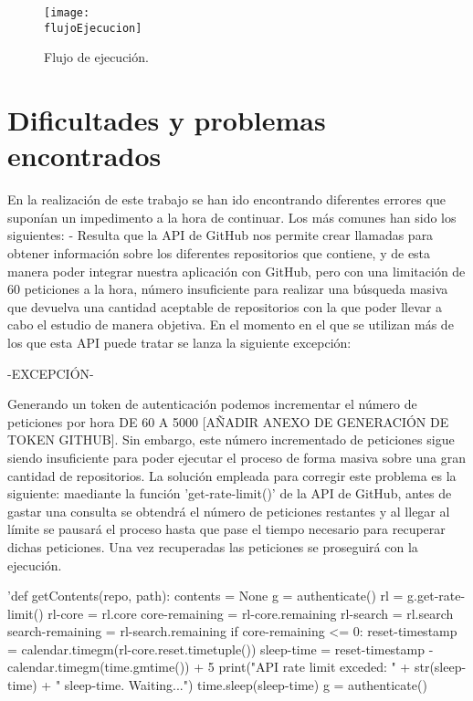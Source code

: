 \begin{figure}
    \centering
    \texttt{[image: \\flujoEjecucion]}
    \caption{Flujo de ejecución.}
\end{figure}


\section{Dificultades y problemas encontrados}
En la realización de este trabajo se han ido encontrando diferentes errores que suponían un impedimento a la hora de continuar. Los más comunes han sido los siguientes:
- Resulta que la API de GitHub nos permite crear llamadas para obtener información sobre los diferentes repositorios que contiene, y de esta manera poder integrar nuestra aplicación con GitHub, pero con una limitación de 60 peticiones a la hora, número insuficiente para realizar una búsqueda masiva que devuelva una cantidad aceptable de repositorios con la que poder llevar a cabo el estudio de manera objetiva. En el momento en el que se utilizan más de los que esta API puede tratar se lanza la siguiente excepción: 

-EXCEPCIÓN-

Generando un token de autenticación podemos incrementar el número de peticiones por hora DE 60 A 5000 [AÑADIR ANEXO DE GENERACIÓN DE TOKEN GITHUB]. Sin embargo, este número incrementado de peticiones sigue siendo insuficiente para poder ejecutar el proceso de forma masiva sobre una gran cantidad de repositorios.
La solución empleada para corregir este problema es la siguiente: maediante la función 'get-rate-limit()' de la API de GitHub, antes de gastar una consulta se obtendrá el número de peticiones restantes y al llegar al límite se pausará el proceso hasta que pase el tiempo necesario para recuperar dichas peticiones. Una vez recuperadas las peticiones se proseguirá con la ejecución.

'def getContents(repo, path):
    contents = None
    g = authenticate()
    rl = g.get-rate-limit()
    rl-core = rl.core
    core-remaining = rl-core.remaining
    rl-search = rl.search
    search-remaining = rl-search.remaining
    if core-remaining <= 0:
        reset-timestamp = calendar.timegm(rl-core.reset.timetuple())
        sleep-time = reset-timestamp - calendar.timegm(time.gmtime()) + 5
        print("API rate limit exceded: " + str(sleep-time) + " sleep-time. Waiting...")
        time.sleep(sleep-time)
        g = authenticate()

